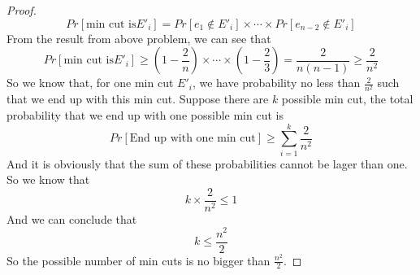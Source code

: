 \documentclass{article}
\begin{document}
\begin{enumerate}
\begin{proof}
\begin{equation}
				Pr\left[\text{min cut is} E'_i\right] = Pr\left[e_1 \not\in E'_i\right] \times \cdots \times Pr\left[e_{n - 2} \not\in E'_i\right] 
			\end{equation}
			From the result from above problem, we can see that \begin{equation}
				Pr\left[\text{min cut is} E'_i\right] \geq (1 - \frac{2}{n})\times \cdots \times (1 - \frac{2}{3}) = \frac{2}{n(n - 1)} \geq \frac{2}{n^2}
			\end{equation}
			So we know that, for one min cut $E'_i$, we have probability no less than $\frac{2}{n^2}$ such that we end up with this min cut. Suppose there are $k$ possible min cut, the total probability that we end up with one possible min cut is \begin{equation}
				Pr\left[\text{End up with one min cut}\right] \geq \sum_{i = 1}^k \frac{2}{n^2}
			\end{equation}
			And it is obviously that the sum of these probabilities cannot be lager than one. So we know that \begin{equation}
				k \times \frac{2}{n^2} \leq 1
			\end{equation}
			And we can conclude that \begin{equation}
				k \leq \frac{n^2}{2}
			\end{equation}
			So the possible number of min cuts is no bigger than $\frac{n^2}{2}$. \end{proof}
		\end{enumerate}
\end{document}

